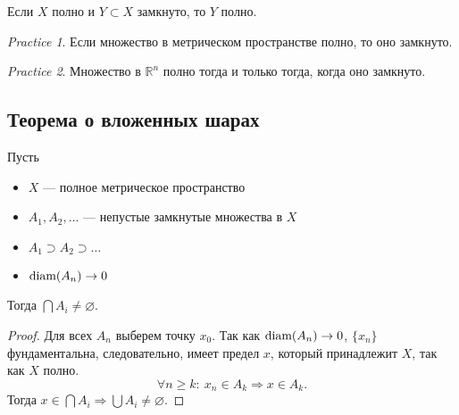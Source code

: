 \documentclass[11pt]{book}
\newcommand{\R}{\mathbb{R}}
\newcommand{\diam}{{\mathop{\text{\rm diam}}}}
\renewcommand{\ge}{\geqslant}
\theoremstyle{definition}
\theoremstyle{plain}
\theoremstyle{plain}
\theoremstyle{definition}
\theoremstyle{remark}
\newtheorem*{prac}{Practice}
\begin{document}
\begin{thm}
    Если $ X$ полно и  $ Y \subset X$ замкнуто, то $ Y$ полно.
\end{thm}
\begin{prac}
    Если множество в метрическом пространстве полно, то оно замкнуто.
\end{prac}
\begin{prac}
    Множество в $ \R^{n} $ полно тогда и только тогда, когда оно замкнуто.
\end{prac}
\subsection{Теорема о вложенных шарах}
\begin{thm}\label{th_vlo_shar}
    Пусть 
    \begin{itemize}
	\item $ X$ --- полное метрическое пространство
	\item $ A_1, A_2, \ldots $ --- непустые замкнутые множества в $ X$
	\item  $ A_1 \supset A_2 \supset \ldots $ 
	\item $ \diam(A_n) \to  0$
    \end{itemize}
    Тогда $ \bigcap A_i \ne \varnothing $.
\end{thm}
\begin{proof}
    Для всех $ A_n$ выберем точку  $ x_0$. Так как $ \diam(A_n) \to  0$, $ \{x_{n}\}$ фундаментальна, следовательно, имеет предел $ x$, который принадлежит $ X$, так как  $ X$ полно.
     \[
    \forall n \ge k: ~ x_{n} \in A_k \Longrightarrow x \in  A_k
    .\] 
    Тогда $ x \in  \bigcap A_i  \Longrightarrow \bigcup A_i \ne \varnothing$.
\end{proof}
\end{document}
